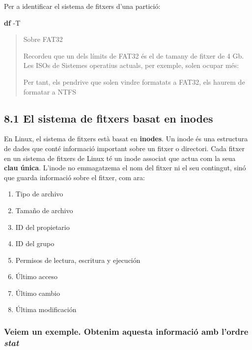 \documentclass[
  12 pt,
  a4paper,
]{article}
\newenvironment{Shaded}{\begin{snugshade}}{\end{snugshade}}
\newcommand{\AttributeTok}[1]{\textcolor[rgb]{0.13,0.29,0.53}{#1}}
\newcommand{\FunctionTok}[1]{\textcolor[rgb]{0.13,0.29,0.53}{\textbf{#1}}}
\providecommand{\tightlist}{%
  \setlength{\itemsep}{0pt}\setlength{\parskip}{0pt}}
\begin{document}
Per a identificar el sistema de fitxers d'una partició:

\begin{Shaded}
\begin{Highlighting}[]
\FunctionTok{df} \AttributeTok{{-}T}
\end{Highlighting}
\end{Shaded}

\begin{quote}
Sobre FAT32

Recordeu que un dels límits de FAT32 és el de tamany de fitxer de 4 Gb.
Les ISOs de Sistemes operatius actuals, per exemple, solen ocupar més:

Per tant, els pendrive que solen vindre formatats a FAT32, els haurem de
formatar a NTFS
\end{quote}

\subsection{8.1 El sistema de fitxers basat en
inodes}\label{el-sistema-de-fitxers-basat-en-inodes}

En Linux, el sistema de fitxers està basat en \textbf{inodes}. Un inode
és una estructura de dades que conté informació important sobre un
fitxer o directori. Cada fitxer en un sistema de fitxers de Linux té un
inode associat que actua com la seua \textbf{clau única}. L'inode no
emmagatzema el nom del fitxer ni el seu contingut, sinó que guarda
informació sobre el fitxer, com ara:

\begin{enumerate}
\def\labelenumi{\arabic{enumi}.}
\tightlist
\item
  Tipo de archivo
\item
  Tamaño de archivo
\item
  ID del propietario
\item
  ID del grupo
\item
  Permisos de lectura, escritura y ejecución
\item
  Último acceso
\item
  Último cambio
\item
  Última modificación
\end{enumerate}

\subsubsection{\texorpdfstring{Veiem un exemple. Obtenim aquesta
informació amb l'ordre
\emph{stat}}{Veiem un exemple. Obtenim aquesta informació amb l'ordre stat}}\label{veiem-un-exemple.-obtenim-aquesta-informaciuxf3-amb-lordre-stat}
\end{document}
